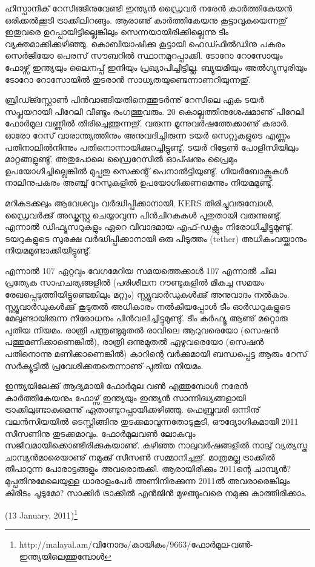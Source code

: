 ഹിസ്പാനിക് റേസിങ്ങിനുവേണ്ടി ഇന്ത്യന്‍ ഡ്രൈവര്‍ നരേന്‍ കാര്‍ത്തികേയന്‍ ഒരിക്കല്‍ക്കൂടി ട്രാക്കിലിറങ്ങും. ആരാണു് 
കാര്‍ത്തികേയനു കൂട്ടാവുകയെന്നതു് ഇതുവരെ ഉറപ്പായിട്ടില്ലെങ്കിലും സെന്നയായിരിക്കില്ലെന്നു ടീം വ്യക്തമാക്കിക്കഴിഞ്ഞു. 
കൊബിയാഷിക്കു കൂട്ടായി ഹെഡ്ഫീല്‍ഡിനു പകരം സെര്‍ജിയോ പെരസ് സൗബറില്‍ സ്ഥാനമുറപ്പാക്കി. ടോറോ
 റോസോയും ഫോഴ്സ് ഇന്ത്യയും ലൈനപ്പ് ഇനിയും പ്രഖ്യാപിച്ചിട്ടില്ല. ബ്യുയമിയും അല്‍ഗ്യുസുരിയും ടോറോ റോസോയില്‍ 
തുടരാന്‍ സാധ്യതയുണ്ടെന്നാണറിയുന്നതു്.

ബ്രിഡ്ജ്സ്റ്റോണ്‍ പിന്‍വാങ്ങിയതിനെത്തുടര്‍ന്നു് റേസിലെ ഏക ടയര്‍ സപ്ലയറായി പിറേലി വീണ്ടും രംഗത്തുവരും. 20 
കൊല്ലത്തിനുശേഷമാണു് പിറേലി ഫോര്‍മുല വണ്ണില്‍ തിരിച്ചെത്തുന്നതു്. വരുന്ന മൂന്നുവര്‍ഷത്തേക്കാണു് കരാര്‍. ഓരോ
റേസ് വാരാന്ത്യത്തിനും അനുവദിച്ചിരുന്ന ടയര്‍ സെറ്റുകളുടെ എണ്ണം പതിനാലില്‍നിന്നും പതിനൊന്നായിക്കുറച്ചിട്ടുണ്ടു്. 
ടയര്‍ റിട്ടേണ്‍ പോളിസിയിലും മാറ്റങ്ങളുണ്ടു്. അതുപോലെ ഡ്രൈറേസില്‍ ഓപ്ഷനും പ്രൈമും 
ഉപയോഗിച്ചില്ലെങ്കില്‍ മുപ്പതു സെക്കന്റ് പെനാല്‍ട്ടിയുണ്ടു്. ഗിയര്‍ബോക്സുകള്‍ നാലിനുപകരം അഞ്ചു് റേസുകളില്‍ 
ഉപയോഗിക്കണമെന്നും നിയമമുണ്ടു്.

മറികടക്കലും ആവേശവും വര്‍ദ്ധിപ്പിക്കാനായി, KERS തിരിച്ചുവരുമ്പോള്‍, ഡ്രൈവര്‍ക്കു് അഡ്ജസ്റ്റു ചെയ്യാവുന്ന 
പിന്‍ചിറകുകള്‍ പുതുതായി വരുന്നുണ്ടു്. എന്നാല്‍ ഡിഫ്യൂസറുകളും ഏറെ വിവാദമായ എഫ്-ഡക്റ്റും നിരോധിച്ചിട്ടുമുണ്ടു്. 
ടയറുകളുടെ സുരക്ഷ വര്‍ദ്ധിപ്പിക്കാനായി ഒരു പിടുത്തം (tether) അധികംവയ്ക്കാനും നിയമമുണ്ടാക്കിയിട്ടുണ്ടു്.

എന്നാല്‍ 107%
ഏറ്റവും വേഗമേറിയ സമയത്തെക്കാള്‍ 107%
എന്നാല്‍ ചില പ്രത്യേക സാഹചര്യങ്ങളില്‍ (പരിശീലന റൗണ്ടുകളില്‍ മികച്ച സമയം രേഖപ്പെടുത്തിയിട്ടുണ്ടെങ്കിലും മറ്റും) 
സ്റ്റ്യുവാര്‍ഡുകള്‍ക്കു് അനുവാദം നല്‍കാം. സ്റ്റ്യൂവാര്‍ഡുകള്‍ക്കു് കൂടുതല്‍ അധികാരം നല്‍കിയപ്പോള്‍ ടീം ഓര്‍ഡറുകളുടെ 
മേലുണ്ടായിരുന്ന നിരോധനം പിന്‍വലിച്ചിട്ടുമുണ്ടു്. ടീം കര്‍ഫ്യൂ ആണു് മറ്റൊരു പുതിയ നിയമം. രാത്രി പന്ത്രണ്ടുമുതല്‍ 
രാവിലെ ആറുവരെയോ (സെഷന്‍ പത്തുമണിക്കാണെങ്കില്‍), രാത്രി ഒന്നുമുതല്‍ ഏഴുവരെയോ (സെഷന്‍ പതിനൊന്നു 
മണിക്കാണെങ്കില്‍) കാറിന്റെ വര്‍ക്കുമായി ബന്ധപ്പെട്ട ആരും റേസ് സര്‍ക്യൂട്ടില്‍ പ്രവേശിക്കരുതെന്നാണു് പുതിയ നിയമം.

ഇന്ത്യയിലേക്കു് ആദ്യമായി ഫോര്‍മുല വണ്‍ എത്തുമ്പോള്‍ നരേന്‍ കാര്‍ത്തികേയനും ഫോഴ്സ് ഇന്ത്യയും ഇന്ത്യന്‍ 
സാന്നിദ്ധ്യങ്ങളായി ട്രാക്കിലുണ്ടാകുമെന്നു് ഏതാണ്ടുറപ്പായിക്കഴിഞ്ഞു. ഫെബ്രുവരി ഒന്നിനു് വലന്‍സിയയില്‍ ടെസ്റ്റിങ്ങിനു 
തുടക്കമാവുന്നതോടുകൂടി, ഔദ്യോഗികമായി 2011 സീസണിനു തുടക്കമാവും. ഫോര്‍മുലവണ്‍ ലോകവും 
സജീവമായിക്കൊണ്ടിരിക്കുകയാണു്. കഴിഞ്ഞ നാലുവര്‍ഷങ്ങളില്‍ നാലു് വ്യത്യസ്ത ചാമ്പ്യന്‍മാരെയാണു് നമുക്കു് 
സീസണ്‍ സമ്മാനിച്ചതു്. മാത്രമല്ല ട്രാക്കില്‍ തീപാറുന്ന പോരാട്ടങ്ങളും അവരൊരുക്കി. ആരായിരിക്കും 2011ന്റെ ചാമ്പ്യന്‍? 
മുപ്പതിനുമേലെയുള്ള ധാരാളംപേര്‍ അണിനിരക്കുന്ന 2011ല്‍ അവരാരെങ്കിലും കിരീടം ചൂടുമോ? സാക്കിര്‍ ട്രാക്കില്‍ 
എന്‍ജിന്‍ മുഴങ്ങുംവരെ നമുക്കു കാത്തിരിക്കാം.

\hspace*{2em}(13 January, 2011)\footnote{http://malayal.am/വിനോദം/കായികം/9663/ഫോര്‍മുല-വണ്‍-ഇന്ത്യയിലെത്തുമ്പോള്‍}

\newpage
